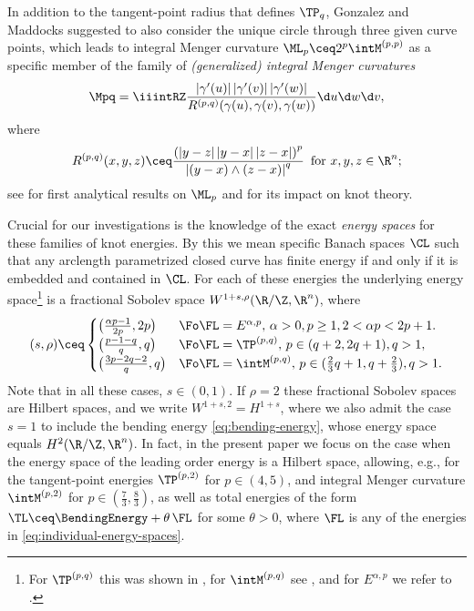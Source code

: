 In addition to the tangent-point radius that defines $\TP_q$,
Gonzalez
and Maddocks suggested to also
consider the unique circle through three given curve points, which
leads to integral Menger curvature $\ML_p\ceq2^p\intM^{(p,p)}$
as a specific member of the family of
\emph{(generalized) integral Menger curvatures}
\begin{equation}\label{eq:intM}
\Mpq=\iiintRZ\frac{\left|\gamma'(u) \right|\left|\gamma'(v) \right|\left|\gamma'(w) \right|}{R^{(p,q)}(\gamma(u),\gamma(v),\gamma(w))}\d u \d w \d v,
\end{equation}
where
\begin{equation}\label{eq:integrand-intM}
R^{(p,q)}(x,y,z)\ceq\frac{\left( \left|y-z \right|\left|y-x \right|\left|z-x \right| \right)^p}{\left|(y-x)\wedge(z-x) \right|^q}\, \text{ for }x,y,z\in\R^n;
\end{equation}
see \cite{strzelecki-etal_2010} for first analytical
results on $\ML_p$ and \cite{strzelecki-etal_2013a} for its
impact on knot theory. 

Crucial for our investigations is the knowledge of the
exact \emph{energy spaces} for these families of knot energies.
By this we mean specific Banach spaces $\CL$ such that any arclength
parametrized closed curve has finite energy if and only if
it is embedded and contained in $\CL$.
For each of these energies the underlying energy space\footnote{For $\TP^{(p,q)}$
this was shown in \cite[Theorem 1.1]{blatt-reiter_2015a}, for $\intM^{(p,q)}$
see \cite[Theorem 1]{blatt-reiter_2015b}, and for $E^{\alpha,p}$ we 
refer to \cite[Theorem 1.1]{blatt_2012a}.}
 is a fractional
Sobolev space $W^{1+s,\rho}(\R/\Z,\R^n)$, where
\begin{equation}\label{eq:individual-energy-spaces}
\textstyle
(s,\rho)\ceq\begin{cases}
\big(\frac{\alpha p-1}{2p},2p\big) & \Fo \FL=E^{\alpha,p},\,
\alpha>0,p\ge 1,2<\alpha p < 2p+1.\\
\big(\frac{p-1-q}{q},q\big) & \textstyle
\Fo \FL=\TP^{(p,q)},\,p\in (q+2,2q+1),q>1,\\ 
\big(\frac{3p-2q-2}q,q\big) & \textstyle
\Fo \FL=\intM^{(p,q)},\,
p\in(\frac23 q+1,q+\frac23), q>1.
\end{cases}
\end{equation}
Note that in all these cases, $s\in (0,1)$.
If $\rho=2$ these fractional Sobolev spaces are Hilbert spaces, and we write
$W^{1+s,2}=H^{1+s}$, where we also admit
the case $s=1$ to include the bending energy \cref{eq:bending-energy},
whose energy space equals $H^2(\R/\Z,\R^n)$. In fact, in the present
paper we focus on the case when the energy space of the
leading order energy is a Hilbert space, allowing, e.g., for
the tangent-point energies $\TP^{(p,2)}$ for $p\in (4,5)$,
and integral Menger curvature $\intM^{(p,2)}$ for $p\in (\frac73,\frac83)$,
as well as total energies of the form $\TL \ceq \BendingEnergy + \theta \, \FL$ for some
$\theta>0$, where $\FL$ is any of the energies in
\cref{eq:individual-energy-spaces}.

